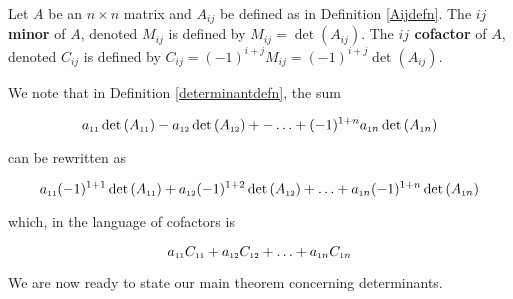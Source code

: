 \smallskip

\colorbox{ResultColor}{\bbm

\begin{defn}  \label{minorcofactordefn} Let $A$ be an $n \times n$ matrix and $A_{ij}$ be defined as in Definition \ref{Aijdefn}.  The   \textbf{\boldmath $ij$ minor} of $A$, denoted $M_{ij}$ is defined by $M_{ij} = \det\left(A_{ij}\right)$. The   \textbf{\boldmath $ij$ cofactor} of $A$, denoted $C_{ij}$ is defined by $C_{ij} = (-1)^{i+j}M_{ij} = (-1)^{i+j}\det\left(A_{ij}\right)$. 

\end{defn}

\ebm}

\smallskip

We note that in Definition \ref{determinantdefn}, the sum 

\[a_{\mbox{\tiny$11$}} \det\left(A_{\mbox{\tiny$11$}}\right)- a_{\mbox{\tiny$12$}} \det\left(A_{\mbox{\tiny$12$}}\right) + -  \ldots  + (-1)^{1+n} a_{\mbox{\tiny$1$}n} \det\left(A_{\mbox{\tiny$1$}n}\right)\]

can be rewritten as

\[a_{\mbox{\tiny$11$}} (-1)^{1+1} \det\left(A_{\mbox{\tiny$11$}}\right) + a_{\mbox{\tiny$12$}} (-1)^{1+2} \det\left(A_{\mbox{\tiny$12$}}\right) + \ldots  + a_{\mbox{\tiny$1$}n} (-1)^{1+n} \det\left(A_{\mbox{\tiny$1$}n}\right)\]

which, in the language of cofactors is

\[a_{\mbox{\tiny$11$}} C_{\mbox{\tiny$11$}} + a_{\mbox{\tiny$12$}}C_{\mbox{\tiny$12$}} + \ldots  + a_{\mbox{\tiny$1$}n}C_{\mbox{\tiny$1$}n} \]

We are now ready to state our main theorem concerning determinants.

\smallskip

